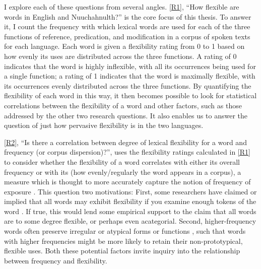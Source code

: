 I explore each of these questions from several angles. \ref{R1}, \enquote{How flexible are words in English and Nuuchahnulth?} is the core focus of this thesis. To answer it, I count the frequency with which lexical words are used for each of the three functions of reference, predication, and modification in a corpus of spoken texts for each language. Each word is given a flexibility rating from 0 to 1 based on how evenly its uses are distributed across the three functions. A rating of 0 indicates that the word is highly inflexible, with all its occurrences being used for a single function; a rating of 1 indicates that the word is maximally flexible, with its occurrences evenly distributed across the three functions. By quantifying the flexibility of each word in this way, it then becomes possible to look for statistical correlations between the flexibility of a word and other factors, such as those addressed by the other two research questions. It also enables us to answer the question of just how pervasive flexibility is in the two languages.

\ref{R2}, \enquote{Is there a correlation between degree of lexical flexibility for a word and frequency (or corpus dispersion)?}, uses the flexibility ratings calculated in \ref{R1} to consider whether the flexibility of a word correlates with either its overall frequency or with its  (how evenly/regularly the word appears in a corpus), a measure which is thought to more accurately capture the notion of frequency of exposure . This question two motivations: First, some researchers have claimed or implied that all words may exhibit flexibility if you examine enough tokens of the word . If true, this would lend some empirical support to the claim that all words are to some degree flexible, or perhaps even acategorial. Second, higher-frequency words often preserve irregular or atypical forms or functions , such that words with higher frequencies might be more likely to retain their non-prototypical, flexible uses. Both these potential factors invite inquiry into the relationship between frequency and flexibility.

